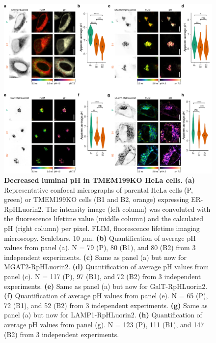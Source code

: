 \begin{figure}
    \includegraphics[keepaspectratio=true,width=\textwidth,height=\textheight]{chapters/chapter4/chapter4_Figure3.pdf}
    \caption{\textbf{Decreased luminal pH in TMEM199KO HeLa cells.} \textbf{(a)} Representative confocal micrographs of parental HeLa cells (P, green) or TMEM199KO cells (B1 and B2, orange) expressing ER-RpHLuorin2. The intensity image (left column) was convoluted with the fluorescence lifetime value (middle column) and the calculated pH (right column) per pixel. FLIM, fluorescence lifetime imaging microscopy. Scalebars, 10 $\mu$m. \textbf{(b)} Quantification of average pH values from panel (a). N = 79 (P), 80 (B1), and 80 (B2) from 3 independent experiments. \textbf{(c)} Same as panel (a) but now for MGAT2-RpHLuorin2. \textbf{(d)} Quantification of average pH values from panel (c). N = 117 (P), 97 (B1), and 72 (B2) from 3 independent experiments. \textbf{(e)} Same as panel (a) but now for GalT-RpHLuorin2. \textbf{(f)} Quantification of average pH values from panel (e). N = 65 (P), 72 (B1), and 52 (B2) from 3 independent experiments. \textbf{(g)} Same as panel (a) but now for LAMP1-RpHLuorin2. \textbf{(h)} Quantification of average pH values from panel (g). N = 123 (P), 111 (B1), and 147 (B2) from 3 independent experiments.}
    \label{fig:ch4fig3}
\end{figure}

